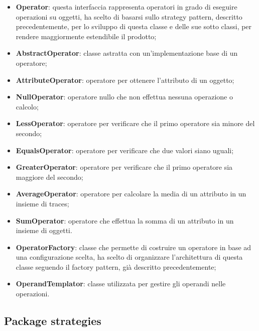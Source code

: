         \begin{itemize}
        	\item \textbf{Operator}: questa interfaccia rappresenta operatori in grado di eseguire operazioni su oggetti,
        		\GroupName{} ha scelto di basarsi sullo strategy pattern, descritto precedentemente, per lo sviluppo di
        		questa classe e delle sue sotto classi, per rendere maggiormente estendibile il prodotto;
        	\item \textbf{AbstractOperator}: classe astratta con un'implementazione base di un operatore;
        	\item \textbf{AttributeOperator}: operatore per ottenere l'attributo di un oggetto;
        	\item \textbf{NullOperator}: operatore nullo che non effettua nessuna operazione o calcolo;
        	\item \textbf{LessOperator}: operatore per verificare che il primo operatore sia minore del secondo;
        	\item \textbf{EqualsOperator}: operatore per verificare che due valori siano uguali;
        	\item \textbf{GreaterOperator}: operatore per verificare che il primo operatore sia maggiore del secondo;
        	\item \textbf{AverageOperator}: operatore per calcolare la media di un attributo in un insieme di traces;
        	\item \textbf{SumOperator}: operatore che effettua la somma di un attributo in un insieme di oggetti.
        	\item \textbf{OperatorFactory}: classe che permette di costruire un operatore in base ad una 
        		configurazione scelta, \GroupName{} ha scelto di organizzare l'architettura di questa classe
        		seguendo il factory pattern, già descritto precedentemente;
        	\item \textbf{OperandTemplator}: classe utilizzata per gestire gli operandi nelle operazioni.
        \end{itemize}

\newpage

    \subsection{Package strategies}


